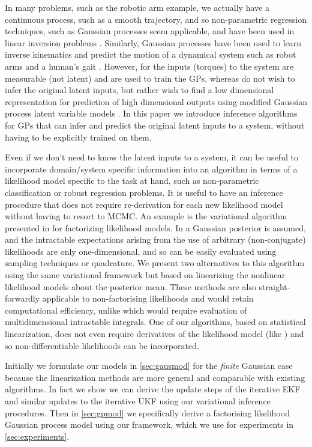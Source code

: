 \documentclass{article} %
\begin{document}
In many problems, such as the robotic arm example, we actually have a
continuous process, such as a smooth trajectory, and so non-parametric
regression techniques, such as Gaussian processes \cite{Rasmussen2006} seem
applicable, and have been used in linear inversion problems \cite{Reid2013}.
Similarly, Gaussian processes have been used to learn inverse kinematics and
predict the motion of a dynamical system such as robot arms
\cite{Rasmussen2006, Williams2008} and a human's gait \cite{Lawrence2003,
    Wang2005, Wang2008}. However, for \cite{Rasmussen2006, Williams2008} the
inputs (torques) to the system are measurable (not latent) and are used to
train the GPs, whereas \cite{Wang2005, Wang2008} do not wish to infer the
original latent inputs, but rather wish to find a low dimensional
representation for prediction of high dimensional outputs using modified
Gaussian process latent variable models \cite{Lawrence2003}. In this paper we
introduce inference algorithms for GPs that can infer and predict the original
latent inputs to a system, without having to be explicitly trained on them.

Even if we don't need to know the latent inputs to a system, it can be useful
to incorporate domain/system specific information into an algorithm in terms of
a likelihood model specific to the task at hand, such as non-parametric
classification or robust regression problems. It is useful to have an inference
procedure that does not require re-derivation for each new likelihood model
without having to resort to MCMC. An example is the variational algorithm
presented in \cite{Opper2009} for factorizing likelihood models. In
\cite{Opper2009} a Gaussian posterior is assumed, and the intractable
expectations arising from the use of arbitrary (non-conjugate) likelihoods are
only one-dimensional, and so can be easily evaluated using sampling techniques
or quadrature. We present two alternatives to this algorithm using the same
variational framework but based on linearizing the nonlinear likelihood models
about the posterior mean. These methods are also straight-forwardly applicable
to non-factorising likelihoods and would retain computational efficiency,
unlike \cite{Opper2009} which would require evaluation of multidimensional
intractable integrals. One of our algorithms, based on statistical
linearization, does not even require derivatives of the likelihood model (like
\cite{Opper2009}) and so non-differentiable likelihoods can be incorporated.

Initially we formulate our models in \autoref{sec:gausmod} for the
\emph{finite} Gaussian case because the linearization methods are more general
and comparable with existing algorithms. In fact we show we can derive the
update steps of the iterative EKF \cite{Bell1993} and similar updates to the
iterative UKF \cite{Sibley2006} using our variational inference procedures.
Then in \autoref{sec:gpmod} we specifically derive a factorising likelihood
Gaussian process model using our framework, which we use for experiments in
\autoref{sec:experiments}.
\end{document}
